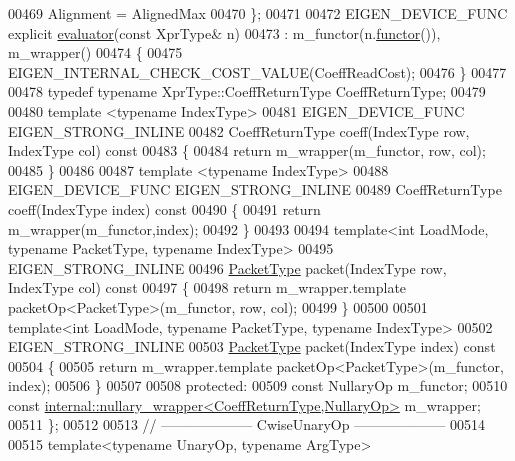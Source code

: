 \begin{DoxyCode}
00469     Alignment = AlignedMax
00470   \};
00471 
00472   EIGEN\_DEVICE\_FUNC \textcolor{keyword}{explicit} \hyperlink{struct_eigen_1_1internal_1_1evaluator}{evaluator}(\textcolor{keyword}{const} XprType& n)
00473     : m\_functor(n.\hyperlink{group___core___module_abef8b2e7bcbcfa98c49caf0a1391ee47}{functor}()), m\_wrapper()
00474   \{
00475     EIGEN\_INTERNAL\_CHECK\_COST\_VALUE(CoeffReadCost);
00476   \}
00477 
00478   \textcolor{keyword}{typedef} \textcolor{keyword}{typename} XprType::CoeffReturnType CoeffReturnType;
00479 
00480   \textcolor{keyword}{template} <\textcolor{keyword}{typename} IndexType>
00481   EIGEN\_DEVICE\_FUNC EIGEN\_STRONG\_INLINE
00482   CoeffReturnType coeff(IndexType row, IndexType col)\textcolor{keyword}{ const}
00483 \textcolor{keyword}{  }\{
00484     \textcolor{keywordflow}{return} m\_wrapper(m\_functor, row, col);
00485   \}
00486 
00487   \textcolor{keyword}{template} <\textcolor{keyword}{typename} IndexType>
00488   EIGEN\_DEVICE\_FUNC EIGEN\_STRONG\_INLINE
00489   CoeffReturnType coeff(IndexType index)\textcolor{keyword}{ const}
00490 \textcolor{keyword}{  }\{
00491     \textcolor{keywordflow}{return} m\_wrapper(m\_functor,index);
00492   \}
00493 
00494   \textcolor{keyword}{template}<\textcolor{keywordtype}{int} LoadMode, \textcolor{keyword}{typename} PacketType, \textcolor{keyword}{typename} IndexType>
00495   EIGEN\_STRONG\_INLINE
00496   \hyperlink{struct_eigen_1_1_packet_type}{PacketType} packet(IndexType row, IndexType col)\textcolor{keyword}{ const}
00497 \textcolor{keyword}{  }\{
00498     \textcolor{keywordflow}{return} m\_wrapper.template packetOp<PacketType>(m\_functor, row, col);
00499   \}
00500 
00501   \textcolor{keyword}{template}<\textcolor{keywordtype}{int} LoadMode, \textcolor{keyword}{typename} PacketType, \textcolor{keyword}{typename} IndexType>
00502   EIGEN\_STRONG\_INLINE
00503   \hyperlink{struct_eigen_1_1_packet_type}{PacketType} packet(IndexType index)\textcolor{keyword}{ const}
00504 \textcolor{keyword}{  }\{
00505     \textcolor{keywordflow}{return} m\_wrapper.template packetOp<PacketType>(m\_functor, index);
00506   \}
00507 
00508 \textcolor{keyword}{protected}:
00509   \textcolor{keyword}{const} NullaryOp m\_functor;
00510   \textcolor{keyword}{const} \hyperlink{struct_eigen_1_1internal_1_1nullary__wrapper}{internal::nullary\_wrapper<CoeffReturnType,NullaryOp>}
       m\_wrapper;
00511 \};
00512 
00513 \textcolor{comment}{// -------------------- CwiseUnaryOp --------------------}
00514 
00515 \textcolor{keyword}{template}<\textcolor{keyword}{typename} UnaryOp, \textcolor{keyword}{typename} ArgType>

\end{DoxyCode}

